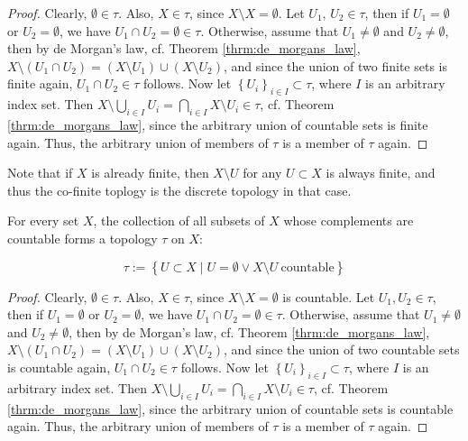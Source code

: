 \begin{proof}
	Clearly, $\emptyset\in\tau$. Also, $X\in\tau$, since $X\setminus X = \emptyset$. Let $U_1$, $U_2\in \tau$, then if $U_1 = \emptyset$ or $U_2 = \emptyset$, we have $U_1 \cap U_2 = \emptyset\in \tau$. Otherwise, assume that $U_1\ne\emptyset$ and $U_2\ne\emptyset$, then by de Morgan's law, cf. Theorem \ref{thrm:de_morgans_law}, $X\setminus (U_1 \cap U_2) = (X\setminus U_1) \cup (X\setminus U_2)$, and since the union of two finite sets is finite again, $U_1\cap U_2\in\tau$ follows. Now let $\left\{U_i\right\}_{i\in I}\subset \tau$, where $I$ is an arbitrary index set. Then $X\setminus \bigcup_{i\in I}U_i = \bigcap_{i\in I}X\setminus U_i\in \tau$, cf. Theorem \ref{thrm:de_morgans_law}, since the arbitrary union of countable sets is finite again. Thus, the arbitrary union of members of $\tau$ is a member of $\tau$ again.
\end{proof}

\begin{remark}
	Note that if $X$ is already finite, then $X\setminus U$ for any $U\subset X$ is always finite, and thus the co-finite toplogy is the discrete topology in that case.
\end{remark}

\begin{exmp}
	For every set $X$, the collection of all subsets of $X$ whose complements are countable forms a topology $\tau$ on $X$:
	
	$$\tau := \left\{ U\subset X\mid U = \emptyset \lor X\setminus U \ \text{countable} \right\}$$
\end{exmp}

\begin{proof}
	Clearly, $\emptyset\in \tau$. Also, $X\in \tau$, since $X\setminus X = \emptyset$ is countable. Let $U_1, U_2\in \tau$, then if $U_1 = \emptyset$ or $U_2 = \emptyset$, we have $U_1 \cap U_2 = \emptyset\in \tau$. Otherwise, assume that $U_1 \ne \emptyset$ and $U_2\ne\emptyset$, then by de Morgan's law, cf. Theorem \ref{thrm:de_morgans_law}, $X\setminus (U_1\cap U_2) = (X\setminus U_1)\cup (X\setminus U_2)$, and since the union of two countable sets is countable again, $U_1\cap U_2\in \tau$ follows. Now let $\left\{U_i\right\}_{i\in I}\subset \tau$, where $I$ is an arbitrary index set. Then $X\setminus \bigcup_{i\in I}U_i = \bigcap_{i\in I}X\setminus U_i\in \tau$, cf. Theorem \ref{thrm:de_morgans_law}, since the arbitrary union of countable sets is countable again. Thus, the arbitrary union of members of $\tau$ is a member of $\tau$ again.
\end{proof}

